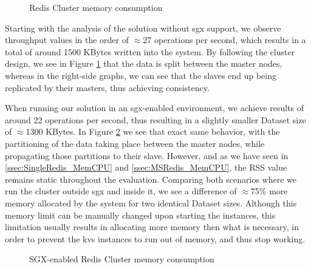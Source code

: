 \begin{figure}[htbp]
	\centering
	\caption{Redis Cluster memory consumption}
	\label{fig:noSgxMemoryConsumption_Cluster}
\end{figure}

Starting with the analysis of the solution without \gls{sgx} support, we observe throughput values in the order of $\approx$27 operations per second, which results in a total of around 1500 KBytes written into the system. By following the cluster design, we see in Figure \ref{fig:noSgxMemoryConsumption_Cluster} that the data is split between the master nodes, whereas in the right-side graphs, we can see that the slaves end up being replicated by their masters, thus achieving consistency. 

When running our solution in an \gls{sgx}-enabled environment, we achieve results of around 22 operations per second, thus resulting in a slightly smaller Dataset size of $\approx$1300 KBytes. In Figure \ref{fig:sgxMemoryConsumption_Cluster} we see that exact same behavior, with the partitioning of the data taking place between the master nodes, while propagating those partitions to their slave. 
However, and as we have seen in \ref{ssec:SingleRedis_MemCPU} and \ref{ssec:MSRedis_MemCPU}, the RSS value remains static throughout the evaluation. 
Comparing both scenarios where we run the cluster outside \gls{sgx} and inside it, we see a difference of $\approx$75\% more memory allocated by the system for two identical Dataset sizes. Although this memory limit can be manually changed upon starting the instances, this limitation usually results in allocating more memory then what is necessary, in order to prevent the \gls{kvs} instances to run out of memory, and thus stop working.

\vspace{5mm}

\begin{figure}[htbp]
	\centering
	\caption{SGX-enabled Redis Cluster memory consumption}
	\label{fig:sgxMemoryConsumption_Cluster}
\end{figure}

